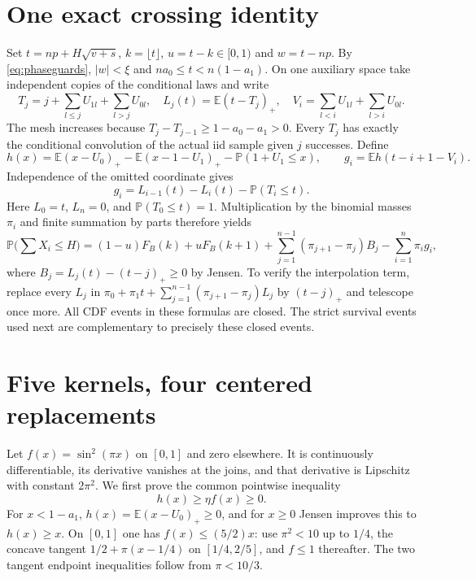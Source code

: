 \documentclass[11pt]{article}
\newcommand{\E}{\mathbb E}\newcommand{\Pp}{\mathbb P}
\begin{document}
\section{One exact crossing identity}

Set $t=np+H\sqrt{v+s}$, $k=\lfloor t\rfloor$, $u=t-k\in[0,1)$ and
$w=t-np$. By \eqref{eq:phaseguards}, $|w|<\xi$ and
$na_0\le t<n(1-a_1)$. On one auxiliary space take independent copies
of the conditional laws and write
\[
T_j=j+\sum_{l\le j}U_{1l}+\sum_{l>j}U_{0l},\quad
L_j(t)=\E(t-T_j)_+,\quad
V_i=\sum_{l<i}U_{1l}+\sum_{l>i}U_{0l}.
\]
The mesh increases because $T_j-T_{j-1}\ge1-a_0-a_1>0$.
Every $T_j$ has exactly the conditional convolution of the actual iid
sample given $j$ successes. Define
\[
h(x)=\E(x-U_0)_+-\E(x-1-U_1)_+-\Pp(1+U_1\le x),\qquad
g_i=\E h(t-i+1-V_i).
\]
Independence of the omitted coordinate gives
\[
g_i=L_{i-1}(t)-L_i(t)-\Pp(T_i\le t).
\]
Here $L_0=t$, $L_n=0$, and $\Pp(T_0\le t)=1$.
Multiplication by the binomial masses $\pi_i$ and finite summation by parts
therefore yields
\begin{equation}\label{eq:cross}
\Pp\Big(\sum X_i\le H\Big)
=(1-u)F_B(k)+uF_B(k+1)
+\sum_{j=1}^{n-1}(\pi_{j+1}-\pi_j)B_j-\sum_{i=1}^n\pi_i g_i,
\end{equation}
where $B_j=L_j(t)-(t-j)_+\ge0$ by Jensen. To verify the interpolation
term, replace every $L_j$ in
$\pi_0+\pi_1t+\sum_{j=1}^{n-1}(\pi_{j+1}-\pi_j)L_j$
by $(t-j)_+$ and telescope once more.
All CDF events in these formulas are closed. The strict survival events
used next are complementary to precisely these closed events.

\section{Five kernels, four centered replacements}

Let $f(x)=\sin^2(\pi x)$ on $[0,1]$ and zero elsewhere.
It is continuously differentiable, its derivative vanishes at the joins,
and that derivative is Lipschitz with constant $2\pi^2$.
We first prove the common pointwise inequality
\begin{equation}\label{eq:minorant} h(x)\ge\eta f(x)\ge0.\end{equation}
For $x<1-a_1$, $h(x)=\E(x-U_0)_+\ge0$, and for $x\ge0$ Jensen
improves this to $h(x)\ge x$. On $[0,1]$ one has $f(x)\le(5/2)x$:
use $\pi^2<10$ up to $1/4$, the concave tangent
$1/2+\pi(x-1/4)$ on $[1/4,2/5]$, and $f\le1$ thereafter.
The two tangent endpoint inequalities follow from $\pi<10/3$.
\end{document}
